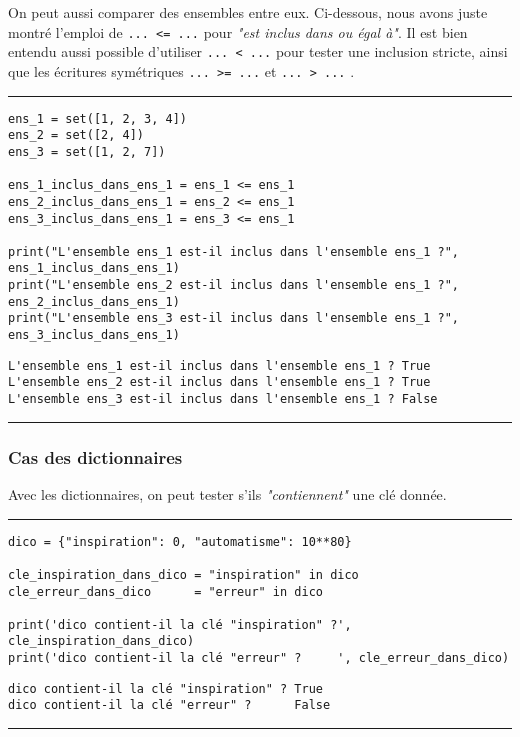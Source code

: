 On peut aussi comparer des ensembles entre eux.
Ci-dessous, nous avons juste montré l'emploi de \texttt{... <= ...} pour \textit{"est inclus dans ou égal à"}.
Il est bien entendu aussi possible d'utiliser \texttt{... < ...} pour tester une inclusion stricte, ainsi que les écritures symétriques \texttt{... >= ...} et \texttt{... > ...} .


\bigskip
{\hrule height .5mm}
\begin{verbatim}
ens_1 = set([1, 2, 3, 4])
ens_2 = set([2, 4])
ens_3 = set([1, 2, 7])

ens_1_inclus_dans_ens_1 = ens_1 <= ens_1
ens_2_inclus_dans_ens_1 = ens_2 <= ens_1
ens_3_inclus_dans_ens_1 = ens_3 <= ens_1

print("L'ensemble ens_1 est-il inclus dans l'ensemble ens_1 ?", ens_1_inclus_dans_ens_1)
print("L'ensemble ens_2 est-il inclus dans l'ensemble ens_1 ?", ens_2_inclus_dans_ens_1)
print("L'ensemble ens_3 est-il inclus dans l'ensemble ens_1 ?", ens_3_inclus_dans_ens_1)
\end{verbatim}
 \color{ForestGreen}
\vspace{-1.5em}
\begin{verbatim}
L'ensemble ens_1 est-il inclus dans l'ensemble ens_1 ? True
L'ensemble ens_2 est-il inclus dans l'ensemble ens_1 ? True
L'ensemble ens_3 est-il inclus dans l'ensemble ens_1 ? False
\end{verbatim} \color{Black}
{\hrule height .5mm}
\bigskip


\subsubsection{Cas des dictionnaires}

Avec les dictionnaires, on peut tester s'ils \textit{"contiennent"} une clé donnée.


\newpage

\bigskip
{\hrule height .5mm}
\begin{verbatim}
dico = {"inspiration": 0, "automatisme": 10**80}

cle_inspiration_dans_dico = "inspiration" in dico
cle_erreur_dans_dico      = "erreur" in dico

print('dico contient-il la clé "inspiration" ?', cle_inspiration_dans_dico)
print('dico contient-il la clé "erreur" ?     ', cle_erreur_dans_dico)
\end{verbatim}
 \color{ForestGreen}
\vspace{-1.5em}
\begin{verbatim}
dico contient-il la clé "inspiration" ? True
dico contient-il la clé "erreur" ?      False
\end{verbatim} \color{Black}
{\hrule height .5mm}
\bigskip
